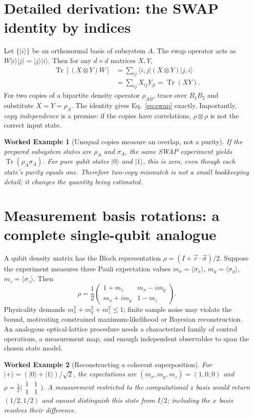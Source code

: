 \documentclass[11pt,a4paper]{article}
\newtheorem{example}{Worked Example}
\newcommand{\tr}{\operatorname{Tr}}
\begin{document}
\section{Detailed derivation: the SWAP identity by indices}
Let $\{|i\rangle\}$ be an orthonormal basis of subsystem $A$. The swap operator acts as $W|i\rangle|j\rangle=|j\rangle|i\rangle$. Then for any $d\times d$ matrices $X,Y$,
\begin{align}
\tr[(X\otimes Y)W]
&=\sum_{ij}\langle i,j|(X\otimes Y)|j,i\rangle\\
&=\sum_{ij}X_{ij}Y_{ji}=\tr(XY).
\end{align}
For two copies of a bipartite density operator $\rho_{AB}$, trace over $B_1B_2$ and substitute $X=Y=\rho_A$. The identity gives Eq.~\eqref{eq:swap} exactly. Importantly, \emph{copy independence} is a premise: if the copies have correlations, $\rho\otimes\rho$ is not the correct input state.
\begin{example}[Unequal copies measure an overlap, not a purity]
If the prepared subsystem states are $\rho_A$ and $\sigma_A$, the same SWAP experiment yields $\tr(\rho_A\sigma_A)$. For pure qubit states $|0\rangle$ and $|1\rangle$, this is zero, even though each state's purity equals one. Therefore two-copy mismatch is not a small bookkeeping detail; it changes the quantity being estimated.
\end{example}
\section{Measurement basis rotations: a complete single-qubit analogue}
A qubit density matrix has the Bloch representation $\rho=(I+\vec r\cdot\vec\sigma)/2$. Suppose the experiment measures three Pauli expectation values $m_x=\langle\sigma_x\rangle$, $m_y=\langle\sigma_y\rangle$, $m_z=\langle\sigma_z\rangle$. Then
\begin{equation}\boxed{\rho=\frac12\begin{pmatrix}1+m_z&m_x-im_y\\m_x+im_y&1-m_z\end{pmatrix}.}\end{equation}
Physicality demands $m_x^2+m_y^2+m_z^2\le1$; finite sample noise may violate the bound, motivating constrained maximum-likelihood or Bayesian reconstruction. An analogous optical-lattice procedure needs a characterized family of control operations, a measurement map, and enough independent observables to span the chosen state model.
\begin{example}[Reconstructing a coherent superposition]
For $|+\rangle=(|0\rangle+|1\rangle)/\sqrt2$, the expectations are $(m_x,m_y,m_z)=(1,0,0)$ and $\rho=\tfrac12\bigl(\begin{smallmatrix}1&1\\1&1\end{smallmatrix}\bigr)$. A measurement restricted to the computational $z$ basis would return $(1/2,1/2)$ and cannot distinguish this state from $I/2$; including the $x$ basis resolves their difference.
\end{example}
\end{document}
